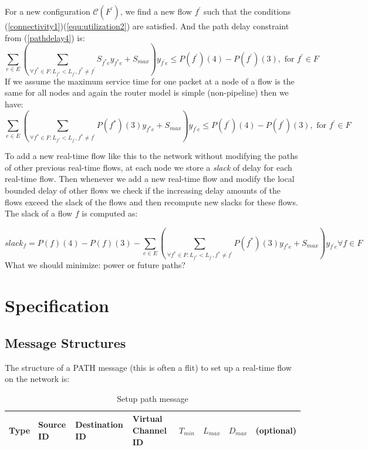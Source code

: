 \documentclass[10pt]{article}
\begin{document}
For a new configuration $\mathcal{C}(F^{'})$, we find a new flow $f^{'}$ such that
the conditions (\ref{connectivity1})(\ref{equ:utilization2}) are satisfied. And
the path delay constraint from (\ref{pathdelay4}) is:
\begin{equation}\label{pathdelay5}
\sum_{e \in E} (\sum_{\forall f^{*} \in F:L_{f^{*}} < L_{f^{'}}, f^{*} \neq f^{'}}S_{f^{*}e}y_{f^{*}e}+S_{max})y_{f^{'}e} 
\leq P(f^{'})(4)-P(f^{'})(3), \mbox{ for } f^{'} \in F
\end{equation}
If we assume the maximum service time for one packet at a node of a flow is the same
for all nodes and again the router model is simple (non-pipeline) then we have:
\begin{equation}\label{pathdelay5}
\sum_{e \in E} (\sum_{\forall f^{*} \in F:L_{f^{*}} < L_{f^{'}}, f^{*} \neq f^{'}}P(f^{*})(3)y_{f^{*}e}+S_{max})y_{f^{'}e} 
\leq P(f^{'})(4)-P(f^{'})(3), \mbox{ for } f^{'} \in F
\end{equation}

To add a new real-time flow like this to the network without modifying the paths
of other previous real-time flows, at each node we store a {\em slack} of delay
for each real-time flow. Then whenever we add a new real-time flow and modify the local
bounded delay of other flows we check if the increasing delay amounts of the flows
exceed the slack of the flows and then recompute new slacks for these flows. The slack
of a flow $f$ is computed as:

\begin{equation}
	slack_f=P(f)(4)-P(f)(3) - 
\sum_{e \in E} (\sum_{\forall f^{*} \in F:L_{f^{*}} < L_{f^{'}}, f^{*} \neq f^{'}}P(f^{*})(3)y_{f^{*}e}+S_{max})y_{f^{'}e} 
 \forall f \in F
\end{equation}
What we should minimize: power or future paths?

\section{Specification}
\subsection{Message Structures}
The structure of a PATH message (this is often a flit) to set up a real-time 
flow on the network is:

\begin{table}[h]
\begin{center}
  \begin{tabular}{ | l | l | l | l | l | l | l | l | }
    \hline
	Type & Source ID & Destination ID & Virtual Channel ID & 
	$T_{min}$ & $L_{max}$ & $D_{max}$ & (optional) \\
    \hline
  \end{tabular}
\end{center}
\caption{Setup path message}
\label{table:PathMsg}
\end{table}
\end{document}
